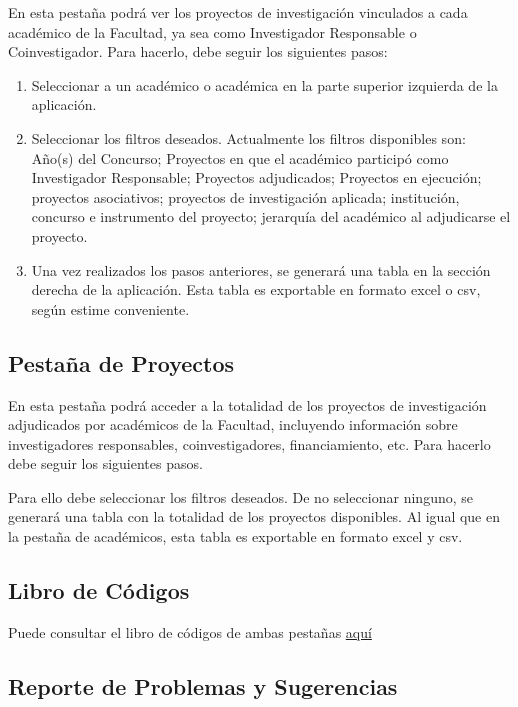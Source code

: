 \documentclass[
  spanish,
  letterpaper,
  DIV=11,
  numbers=noendperiod]{scrreprt}
\begin{document}
En esta pestaña podrá ver los proyectos de investigación vinculados a
cada académico de la Facultad, ya sea como Investigador Responsable o
Coinvestigador. Para hacerlo, debe seguir los siguientes pasos:

\begin{enumerate}
\def\labelenumi{\arabic{enumi})}
\item
  Seleccionar a un académico o académica en la parte superior izquierda
  de la aplicación.
\item
  Seleccionar los filtros deseados. Actualmente los filtros disponibles
  son: Año(s) del Concurso; Proyectos en que el académico participó como
  Investigador Responsable; Proyectos adjudicados; Proyectos en
  ejecución; proyectos asociativos; proyectos de investigación aplicada;
  institución, concurso e instrumento del proyecto; jerarquía del
  académico al adjudicarse el proyecto.
\item
  Una vez realizados los pasos anteriores, se generará una tabla en la
  sección derecha de la aplicación. Esta tabla es exportable en formato
  excel o csv, según estime conveniente.
\end{enumerate}

\subsection{Pestaña de Proyectos}\label{pestauxf1a-de-proyectos}

En esta pestaña podrá acceder a la totalidad de los proyectos de
investigación adjudicados por académicos de la Facultad, incluyendo
información sobre investigadores responsables, coinvestigadores,
financiamiento, etc. Para hacerlo debe seguir los siguientes pasos.

Para ello debe seleccionar los filtros deseados. De no seleccionar
ninguno, se generará una tabla con la totalidad de los proyectos
disponibles. Al igual que en la pestaña de académicos, esta tabla es
exportable en formato excel y csv.

\subsection{Libro de Códigos}\label{libro-de-cuxf3digos}

Puede consultar el libro de códigos de ambas pestañas
\href{https://dip-facso.shinyapps.io/consultas/_w_13f4a94ea5194a07abbd823f4c5537d2/www/codebook.html}{aquí}

\subsection{Reporte de Problemas y
Sugerencias}\label{reporte-de-problemas-y-sugerencias}
\end{document}
